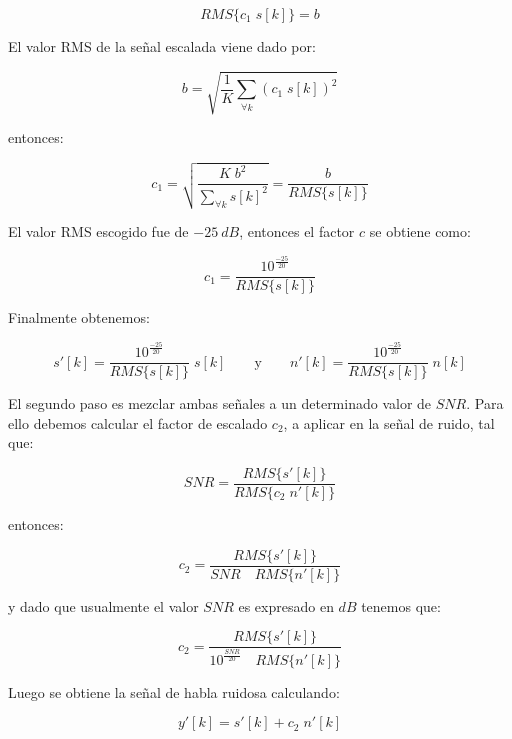 \begin{equation*}
	RMS\{c_1 \; s[k]\} = b
\end{equation*}

El valor RMS de la señal escalada viene dado por:

\begin{equation*}
	b = \sqrt{\frac{1}{K} \sum_{\forall k} (c_1 \; s[k])^2}
\end{equation*}

\noindent entonces:

\begin{equation*}
	c_1 = \sqrt{\frac{K \; b^2}{\sum_{\forall k} s[k]^2}} = \frac{b}{RMS\{s[k]\}}
\end{equation*}

El valor RMS escogido fue de $\SI{-25}{dB}$, entonces el factor $c$ se obtiene como:

\begin{equation*}
	c_1 = \frac{10^{\frac{-25}{20}}}{RMS\{s[k]\}}
\end{equation*}

Finalmente obtenemos:

\begin{equation*}
	s'[k] = \frac{10^{\frac{-25}{20}}}{RMS\{s[k]\}} \; s[k] \qquad \text{y} \qquad n'[k] = \frac{10^{\frac{-25}{20}}}{RMS\{s[k]\}} \; n[k]
\end{equation*}

El segundo paso es mezclar ambas señales a un determinado valor de $SNR$. Para ello debemos calcular el factor de escalado $c_2$, a aplicar en la señal de ruido, tal que:

\begin{equation*}
	SNR = \frac{RMS\{s'[k]\}}{RMS\{c_2 \; n'[k]\}}
\end{equation*}

\noindent entonces:

\begin{equation*}
	c_2 = \frac{RMS\{s'[k]\}}{SNR \quad RMS\{n'[k]\}}
\end{equation*}

\noindent y dado que usualmente el valor $SNR$ es expresado en $\si{dB}$ tenemos que:

\begin{equation*}
	c_2 = \frac{RMS\{s'[k]\}}{10^{\frac{SNR}{20}} \quad RMS\{n'[k]\}}
\end{equation*}

Luego se obtiene la señal de habla ruidosa calculando:

\begin{equation*}
	y'[k] = s'[k] + c_2 \; n'[k]
\end{equation*}

